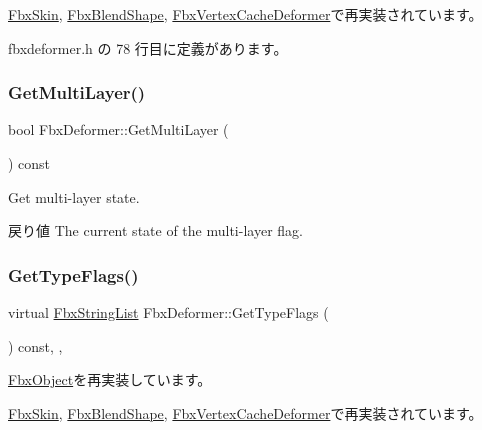\hyperlink{class_fbx_skin_abaf5fca14c0e8339ea692560fbd494d8}{Fbx\+Skin}, \hyperlink{class_fbx_blend_shape_afc886286ac95264b993335d8b3954b4f}{Fbx\+Blend\+Shape}, \hyperlink{class_fbx_vertex_cache_deformer_ab213400e170fe58699649acaf652c787}{Fbx\+Vertex\+Cache\+Deformer}で再実装されています。



 fbxdeformer.\+h の 78 行目に定義があります。

\mbox{\label{class_fbx_deformer_a1f56fdb78d3b615bb2b4b4d142436e8b}} 
\subsubsection{\texorpdfstring{Get\+Multi\+Layer()}{GetMultiLayer()}}
{\footnotesize\ttfamily bool Fbx\+Deformer\+::\+Get\+Multi\+Layer (\begin{DoxyParamCaption}{ }\end{DoxyParamCaption}) const}

Get multi-\/layer state. \begin{DoxyReturn}{戻り値}
The current state of the multi-\/layer flag. 
\end{DoxyReturn}
\mbox{\label{class_fbx_deformer_ac3f5a3eb2dda62397fc667004d798319}} 
\subsubsection{\texorpdfstring{Get\+Type\+Flags()}{GetTypeFlags()}}
{\footnotesize\ttfamily virtual \hyperlink{class_fbx_string_list}{Fbx\+String\+List} Fbx\+Deformer\+::\+Get\+Type\+Flags (\begin{DoxyParamCaption}{ }\end{DoxyParamCaption}) const\hspace{0.3cm}{\ttfamily [inline]}, {\ttfamily [protected]}, {\ttfamily [virtual]}}



\hyperlink{class_fbx_object_a6d30a5d00400039a248977cf9f9255b2}{Fbx\+Object}を再実装しています。



\hyperlink{class_fbx_skin_a736228a80b5d0db0075527767286be2d}{Fbx\+Skin}, \hyperlink{class_fbx_blend_shape_aa2b22b70c929ac1ad39b12f0ade998d1}{Fbx\+Blend\+Shape}, \hyperlink{class_fbx_vertex_cache_deformer_a67322e24180497b1f268cad5ed29c08b}{Fbx\+Vertex\+Cache\+Deformer}で再実装されています。



